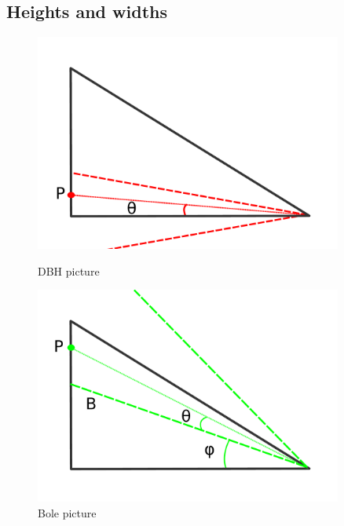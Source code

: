 \subsection{Heights and widths} 
\begin{figure}[!htb]
		\centering
  		\includegraphics[width=0.9\textwidth]{triangle1.pdf}
	  	\caption{DBH picture}
	  	\label{triangle1}
	\endminipage\hfill
		\centering
	  	\includegraphics[width=0.9\textwidth]{triangle2.pdf}
	  	\caption{Bole picture}
	  	\label{triangle2}
	\endminipage\hfill
\end{figure}

